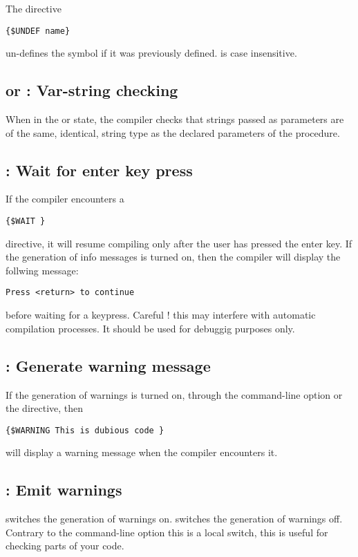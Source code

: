 \documentclass{report}
\begin{document}
The directive
\begin{verbatim}
{$UNDEF name}
\end{verbatim}
un-defines the symbol  if it was previously defined.
 is case insensitive.


\subsection{ or  : Var-string checking}

When in the \var{+} or  state, the compiler checks that strings
passed as parameters are of the same, identical, string type as the declared
parameters of the procedure.

\subsection{ : Wait for enter key press}

If the compiler encounters a
\begin{verbatim}
{$WAIT }
\end{verbatim}
directive, it will resume compiling only after the user has pressed the
enter key. If the generation of info messages is turned on, then the compiler
will display the follwing message:
\begin{verbatim}
Press <return> to continue
\end{verbatim}
before waiting for a keypress. Careful ! this may interfere with automatic
compilation processes. It should be used for debuggig purposes only.

\subsection{ : Generate warning message}

If the generation of warnings is turned on, through the 
command-line option or the  directive, then
\begin{verbatim}
{$WARNING This is dubious code }
\end{verbatim}
will display a warning message when the compiler encounters it.

\subsection{ : Emit warnings}

 switches the generation of warnings on.
 switches the generation of warnings off.
Contrary to the command-line option  this
is a local switch, this is useful for checking parts of your code.
\end{document}
